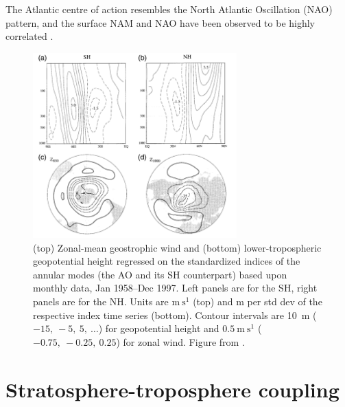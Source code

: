 The Atlantic centre of action resembles the North Atlantic Oscillation (NAO)
pattern, and the surface NAM and NAO have been observed to be highly correlated
\citep{Ambaum2001}.

\begin{figure}
 \centering
 \noindent\includegraphics[width=0.7\textwidth]{figures/chapter-intro/annular_modes_TW.png}
 \caption[Annular mode patterns from \citet{Thompson2000a}]{(top) Zonal-mean
   geostrophic wind and (bottom) lower-tropospheric geopotential height
   regressed on the standardized indices of the annular modes (the AO and its SH
   counterpart) based upon monthly data, Jan 1958--Dec 1997. Left panels are for
   the SH, right panels are for the NH. Units are $\mathrm{m~s^1}$ (top) and m
   per std dev of the respective index time series (bottom). Contour intervals
   are 10~m ($-15,~-5,~5,~\dots$) for geopotential height and
   $\mathrm{0.5~m~s^1}$ ($-0.75,~-0.25,~0.25$) for zonal wind. Figure from
   \citet{Thompson2000a}.}
 \label{fig:annular_modes}
\end{figure}


\section{Stratosphere-troposphere coupling}
\label{sec:strat-trop-coupl}



